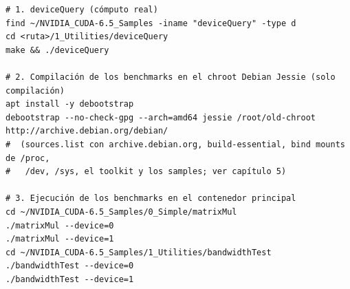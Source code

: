 \begin{Verbatim}
# 1. deviceQuery (cómputo real)
find ~/NVIDIA_CUDA-6.5_Samples -iname "deviceQuery" -type d
cd <ruta>/1_Utilities/deviceQuery
make && ./deviceQuery

# 2. Compilación de los benchmarks en el chroot Debian Jessie (solo compilación)
apt install -y debootstrap
debootstrap --no-check-gpg --arch=amd64 jessie /root/old-chroot http://archive.debian.org/debian/
#  (sources.list con archive.debian.org, build-essential, bind mounts de /proc,
#   /dev, /sys, el toolkit y los samples; ver capítulo 5)

# 3. Ejecución de los benchmarks en el contenedor principal
cd ~/NVIDIA_CUDA-6.5_Samples/0_Simple/matrixMul
./matrixMul --device=0
./matrixMul --device=1
cd ~/NVIDIA_CUDA-6.5_Samples/1_Utilities/bandwidthTest
./bandwidthTest --device=0
./bandwidthTest --device=1
\end{Verbatim}
